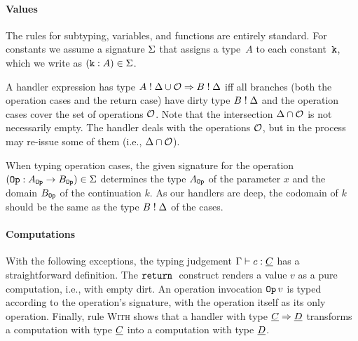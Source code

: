 \paragraph{Values}
The rules for subtyping, variables, and functions are entirely standard. For constants we assume a signature $\Sigma$ that assigns a type~$A$ to each constant~$\mathtt{k}$, which we write as $(\mathtt{k} \mathrel{:} A) \in \Sigma$.

A handler expression has type $A \mathrel{!} \Delta \cup \mathcal{O} \Rightarrow B \mathrel{!} \Delta$ iff all branches (both the operation cases and the return case) have dirty type $B \mathrel{!} \Delta$ and the operation cases cover the set of operations $\mathcal{O}$. Note that the intersection $\Delta \cap \mathcal{O}$ is not necessarily empty. The handler deals with the operations $\mathcal{O}$, but in the process may re-issue some of them (i.e., $\Delta \cap \mathcal{O}$).

When typing operation cases, the given signature for the operation $(\mathtt{Op} \mathrel{:} A_{\mathtt{Op}} \to B_{\mathtt{Op}}) \in \Sigma$ determines the type $A_{\mathtt{Op}}$ of the parameter $x$ and the domain $B_{\mathtt{Op}}$ of the continuation $k$. As our handlers are deep, the codomain of $k$ should be the same as the type $B \mathrel{!} \Delta$ of the cases.

\paragraph{Computations}
With the following exceptions, the typing judgement $\Gamma \vdash c : \underline{C}$ has a straightforward definition. The $\mathtt{return}\;$ construct renders a value $v$ as a pure computation, i.e., with empty dirt. An operation invocation $\mathtt{Op}\,v$ is typed according to the operation's signature, with the operation itself as its only operation. Finally, rule \textsc{With} shows that a handler with type $\underline{C} \Rightarrow \underline{D}$ transforms a computation with type $\underline{C}$ into a computation with type $\underline{D}$.

